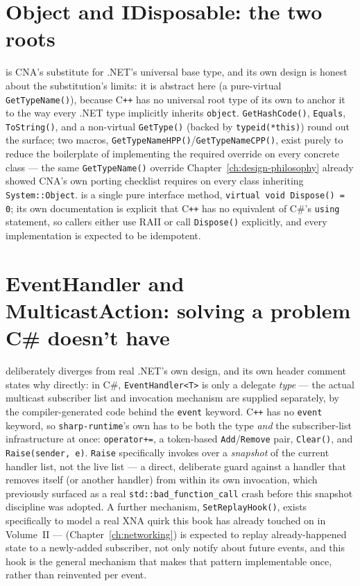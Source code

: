 \section{Object and IDisposable: the two roots}

 is CNA's substitute for .NET's universal base type, and its own
design is honest about the substitution's limits: it is abstract here (a pure-virtual
\texttt{GetTypeName()}), because C\texttt{++} has no universal root type of its own to anchor
it to the way every .NET type implicitly inherits \texttt{object}. \texttt{GetHashCode()},
\texttt{Equals}, \texttt{ToString()}, and a non-virtual \texttt{GetType()} (backed by
\texttt{typeid(*this)}) round out the surface; two macros,
\texttt{GetTypeNameHPP()}/\texttt{GetTypeNameCPP()}, exist purely to reduce the boilerplate of
implementing the required override on every concrete class --- the same
\texttt{GetTypeName()} override Chapter~\ref{ch:design-philosophy} already showed CNA's own
porting checklist requires on every class inheriting \texttt{System::Object}.
 is a single pure interface method,
\texttt{virtual void Dispose() = 0}; its own documentation is explicit that C\texttt{++} has
no equivalent of C\#'s \texttt{using} statement, so callers either use RAII or call
\texttt{Dispose()} explicitly, and every implementation is expected to be idempotent.

\section{EventHandler and MulticastAction: solving a problem C\# doesn't have}

 deliberately diverges from real .NET's own
design, and its own header comment states why directly: in C\#, \texttt{EventHandler<T>} is
only a delegate \emph{type} --- the actual multicast subscriber list and invocation mechanism
are supplied separately, by the compiler-generated code behind the \texttt{event} keyword.
C\texttt{++} has no \texttt{event} keyword, so \texttt{sharp-runtime}'s own
 has to be both the type \emph{and} the subscriber-list
infrastructure at once: \texttt{operator+=}, a token-based \texttt{Add}/\texttt{Remove} pair,
\texttt{Clear()}, and \texttt{Raise(sender, e)}. \texttt{Raise} specifically invokes over a
\emph{snapshot} of the current handler list, not the live list --- a direct, deliberate guard
against a handler that removes itself (or another handler) from within its own invocation,
which previously surfaced as a real \texttt{std::bad\_function\_call} crash before this
snapshot discipline was adopted. A further mechanism, \texttt{SetReplayHook()}, exists
specifically to model a real XNA quirk this book has already touched on in Volume~II ---
 (Chapter~\ref{ch:networking}) is expected to replay
already-happened state to a newly-added subscriber, not only notify about future events, and
this hook is the general mechanism that makes that pattern implementable once, rather than
reinvented per event.

